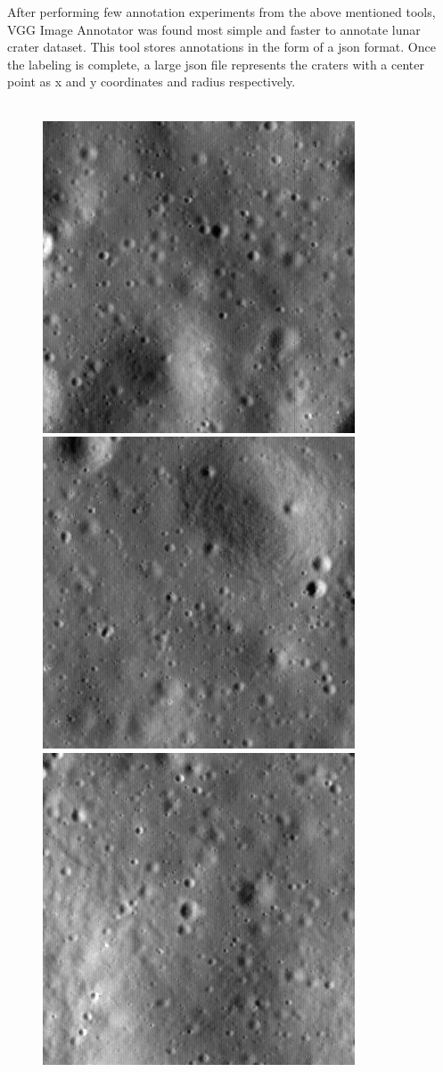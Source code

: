 \documentclass[11pt]{article}
\begin{document}
After performing few annotation experiments from the above mentioned tools, VGG Image Annotator was found most simple and faster to annotate lunar crater dataset. This tool stores annotations in the form of a json format. Once the labeling is complete, a large json file represents the craters with a center point as x and y coordinates and radius respectively. \\\\

\begin{figure}[ht!]
	\includegraphics[width=.3\textwidth]{files/annotation/66.png}\hfill
	\includegraphics[width=.3\textwidth]{files/annotation/29.png}\hfill
	\includegraphics[width=.3\textwidth]{files/annotation/20.png}
\end{figure}
\end{document}
